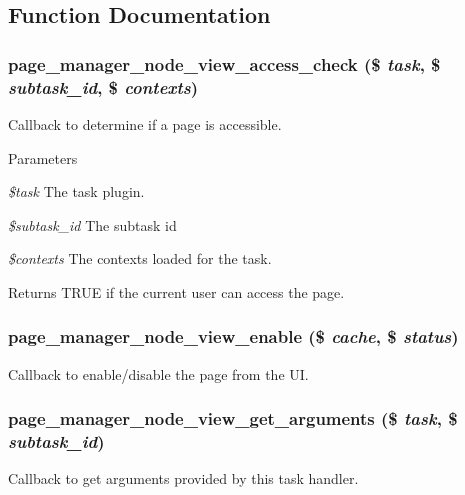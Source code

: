 \subsection{Function Documentation}
\hypertarget{node__view_8inc_a7df7b4deae90b75a224830a8a30ea3bb}{
\subsubsection[{page\_\-manager\_\-node\_\-view\_\-access\_\-check}]{\setlength{\rightskip}{0pt plus 5cm}page\_\-manager\_\-node\_\-view\_\-access\_\-check (\$ {\em task}, \/  \$ {\em subtask\_\-id}, \/  \$ {\em contexts})}}
\label{node__view_8inc_a7df7b4deae90b75a224830a8a30ea3bb}
Callback to determine if a page is accessible.


\begin{DoxyParams}{Parameters}
\item[{\em \$task}]The task plugin. \item[{\em \$subtask\_\-id}]The subtask id \item[{\em \$contexts}]The contexts loaded for the task. \end{DoxyParams}
\begin{DoxyReturn}{Returns}
TRUE if the current user can access the page. 
\end{DoxyReturn}
\hypertarget{node__view_8inc_aff295e14702bf8bd43e4b7911ae30360}{
\subsubsection[{page\_\-manager\_\-node\_\-view\_\-enable}]{\setlength{\rightskip}{0pt plus 5cm}page\_\-manager\_\-node\_\-view\_\-enable (\$ {\em cache}, \/  \$ {\em status})}}
\label{node__view_8inc_aff295e14702bf8bd43e4b7911ae30360}
Callback to enable/disable the page from the UI. \hypertarget{node__view_8inc_a510f191ee5d56d0d4b6d7736ccf23a81}{
\subsubsection[{page\_\-manager\_\-node\_\-view\_\-get\_\-arguments}]{\setlength{\rightskip}{0pt plus 5cm}page\_\-manager\_\-node\_\-view\_\-get\_\-arguments (\$ {\em task}, \/  \$ {\em subtask\_\-id})}}
\label{node__view_8inc_a510f191ee5d56d0d4b6d7736ccf23a81}
Callback to get arguments provided by this task handler.


